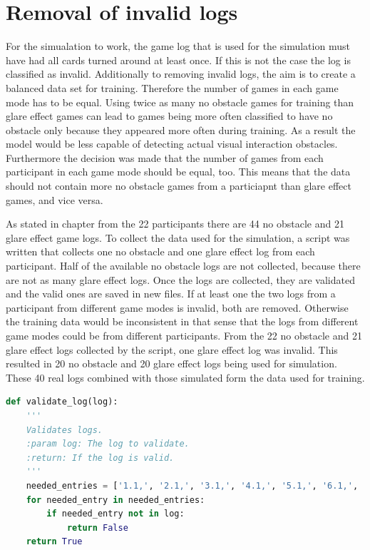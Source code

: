 \section{Removal of invalid logs}
For the simualation to work, the game log that is used for the simulation must have had all cards turned around at least once. If this is not the case the log is classified as invalid. Additionally to removing invalid logs, the aim is to create a balanced data set for training. Therefore the number of games in each game mode has to be equal. Using twice as many no obstacle games for training than glare effect games can lead to games being more often classified to have no obstacle only because they appeared more often during training. As a result the model would be less capable of detecting actual visual interaction obstacles. Furthermore the decision was made that the number of games from each participant in each game mode should be equal, too. This means that the data should not contain more no obstacle games from a particiapnt than glare effect games, and vice versa.

As stated in chapter  from the 22 participants there are 44 no obstacle and 21 glare effect game logs. To collect the data used for the simulation, a script was written that collects one no obstacle and one glare effect log from each participant. Half of the available no obstacle logs are not collected, because there are not as many glare effect logs. Once the logs are collected, they are validated and the valid ones are saved in new files. If at least one the two logs from a participant from different game modes is invalid, both are removed. Otherwise the training data would be inconsistent in that sense that the logs from different game modes could be from different participants. From the 22 no obstacle and 21 glare effect logs collected by the script, one glare effect log was invalid. This resulted in 20 no obstacle and 20 glare effect logs being used for simulation. These 40 real logs combined with those simulated form the data used for training. 
\begin{lstlisting}[language=python, caption=Add caption]
def validate_log(log):
	'''
	Validates logs.
	:param log: The log to validate. 
	:return: If the log is valid.
	'''
	needed_entries = ['1.1,', '2.1,', '3.1,', '4.1,', '5.1,', '6.1,', '7.1,', '1.2,', '2.2,', '3.2,', '4.2,', '5.2,', '6.2,', '7.2,']
	for needed_entry in needed_entries:
		if needed_entry not in log:
			return False
	return True
\end{lstlisting}

